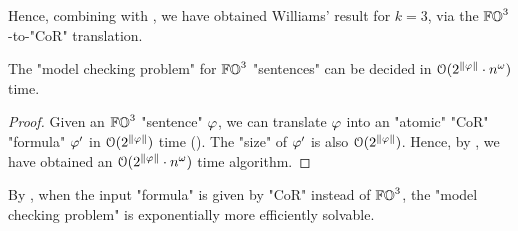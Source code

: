 Hence, combining with , we have obtained Williams' result for $k = 3$, via the $\mathbb{FO}^{3}$-to-"CoR" translation.
\begin{theorem}\label{theorem: fo3 model checking}
    The "model checking problem" for $\mathbb{FO}^{3}$ "sentences" can be decided in $\mathcal{O}(2^{\len{\fml}} \cdot n^{\omega})$ time.
\end{theorem}
\begin{proof}
    Given an $\mathbb{FO}^{3}$ "sentence" $\fml$,
    we can translate $\fml$ into an "atomic" "CoR" "formula" $\fml'$ in $\mathcal{O}(2^{\len{\fml}})$ time ().
    The "size" of $\fml'$ is also $\mathcal{O}(2^{\len{\fml}})$.
    Hence, by , we have obtained an $\mathcal{O}(2^{\len{\fml}} \cdot n^{\omega})$ time algorithm.
\end{proof}
By ,
when the input "formula" is given by "CoR" instead of $\mathbb{FO}^{3}$, the "model checking problem" is exponentially more efficiently solvable.



